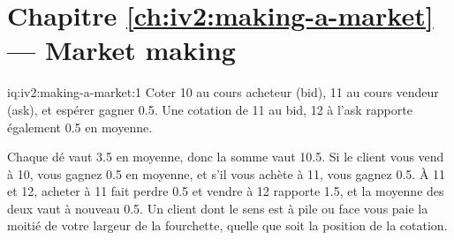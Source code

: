 \section*{Chapitre \ref{ch:iv2:making-a-market} --- Market making}

\begin{solution}{iq:iv2:making-a-market:1}
Coter 10 au cours acheteur (bid), 11 au cours vendeur (ask), et espérer gagner 0.5. Une cotation de 11 au bid, 12 à l'ask rapporte également 0.5 en moyenne.

Chaque dé vaut 3.5 en moyenne, donc la somme vaut 10.5. Si le client vous vend à 10, vous gagnez 0.5 en moyenne, et s'il vous achète à 11, vous gagnez 0.5. À 11 et 12, acheter à 11 fait perdre 0.5 et vendre à 12 rapporte 1.5, et la moyenne des deux vaut à nouveau 0.5. Un client dont le sens est à pile ou face vous paie la moitié de votre largeur de la fourchette, quelle que soit la position de la cotation.

\end{solution}

